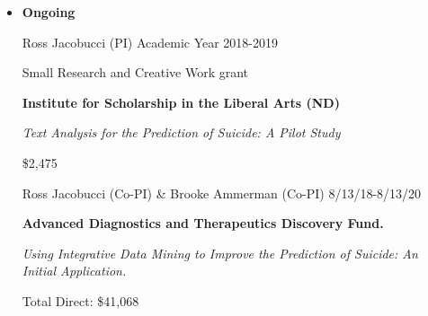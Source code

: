 \documentclass[letterpaper,10pt]{article}
\begin{document}
\begin{itemize} 
	\setlength{\topsep}{0pt}%
	\setlength{\leftmargin}{0.1in}%
	\setlength{\listparindent}{-0.1in}%
	\setlength{\itemindent}{-0.2in}%
	\setlength{\parsep}{\parskip}%
\begin{comment}		
	\item {\textbf{\large{Pending}}}


\begin{center}
	\parbox{6.5in}{{Ross Jacobucci (PI) }   \hspace{9cm} Under Review}
	\parbox{6.5in}{\textbf{IES Statistical and Research Methodology in Education: Early Career Grant} }
	\parbox{6.5in}{\textit{Extending Regularized Structural Equation Modeling for Big Data in Education Research}}
	\parbox{6.5in}{Total Direct: \$139,759}
\end{center}

\begin{center}
	\parbox{6.5in}{{Ross Jacobucci (Co-PI) \& Brooke Ammerman (Co-PI)}   \hspace{3.8cm} Under Review}
	\parbox{6.5in}{\textbf{NIH 1R03MH120488-01} }
	\parbox{6.5in}{\textit{The Implementation and Validation of Integrative Machine Learning for Predicting Suicide Outcomes}}
	\parbox{6.5in}{Total Direct: \$99,188}
\end{center}
\end{comment}	

	
	\item{\textbf{\large{Ongoing}}}
	
	\begin{center}
		\parbox{6.5in}{{Ross Jacobucci (PI) }   \hspace{9cm} Academic Year 2018-2019}
		\parbox{6.5in}{Small Research and Creative Work grant}
		\parbox{6.5in}{\textbf{Institute for Scholarship in the Liberal Arts (ND)} }
		\parbox{6.5in}{\textit{Text Analysis for the Prediction of Suicide: A Pilot Study}}
		\parbox{6.5in}{\$2,475}
	\end{center}
	
	
	
	\begin{center}
		\parbox{6.5in}{{Ross Jacobucci (Co-PI) \& Brooke Ammerman (Co-PI)}   \hspace{3.8cm} 8/13/18-8/13/20}
		\parbox{6.5in}{\textbf{Advanced Diagnostics and Therapeutics Discovery Fund.} }
		\parbox{6.5in}{\textit{Using Integrative Data Mining to Improve the Prediction of Suicide: An Initial Application.}}
		\parbox{6.5in}{Total Direct: \$41,068}
	\end{center}


\end{itemize}
\end{document}
